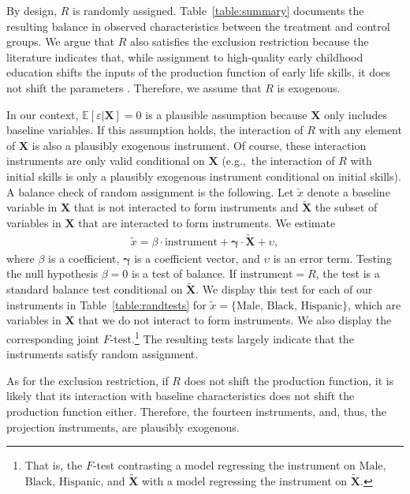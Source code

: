 By design, $R$ is randomly assigned. Table~\ref{table:summary} documents the resulting balance in observed characteristics between the treatment and control groups. We argue that $R$ also satisfies the exclusion restriction because the literature indicates that, while assignment to high-quality early childhood education shifts the inputs of the production function of early life skills, it does not shift the parameters \citep{attanasioEstimatingProductionFunction2020b,heckmanUnderstandingMechanismsWhich2013b}. Therefore, we assume that $R$ is exogenous. 

In our context, $\mathbb{E} \left[ \varepsilon | \bm{X} \right] = 0$ is a plausible assumption because $\bm{X}$ only includes baseline variables. If this assumption holds, the interaction of $R$ with any element of $\bm{X}$ is also a plausibly exogenous instrument. Of course, these interaction instruments are only valid conditional on $\bm{X}$ (e.g.,\ the interaction of $R$ with initial skills is only a plausibly exogenous instrument conditional on initial skills). A balance check of random assignment is the following. Let $\tilde{x}$ denote a baseline variable in $\bm{X}$ that is not interacted to form instruments and $\tilde{\bm{X}}$ the subset of variables in $\bm{X}$ that are interacted to form instruments. We estimate
\begin{align}
 \tilde{x} = \beta \cdot \text{instrument} + \bm{\gamma} \cdot \tilde{\bm{X}} + \upsilon,
\end{align}
\noindent where $\beta$ is a coefficient, $\bm{\gamma}$ is a coefficient vector, and $\upsilon$ is an error term. Testing the null hypothesis $\beta = 0$ is a test of balance. If $\text{instrument} = R$, the test is a standard balance test conditional on $\tilde{\bm{X}}$. We display this test for each of our instruments in Table~\ref{table:randtests} for $\tilde{x} = \{ \text{Male, Black, Hispanic} \} $, which are variables in $\bm{X}$ that we do not interact to form instruments. We also display the corresponding joint $F$-test.\footnote{That is, the $F$-test contrasting a model regressing the instrument on $\text{Male}$, $\text{Black}$, $\text{Hispanic}$, and $\tilde{\bm{X}}$ with a model regressing the instrument on $\tilde{\bm{X}}$.} The resulting tests largely indicate that the instruments satisfy random assignment.

As for the exclusion restriction, if $R$ does not shift the production function, it is likely that its interaction with baseline characteristics does not shift the production function either. Therefore, the fourteen instruments, and, thus, the projection instruments, are plausibly exogenous.

